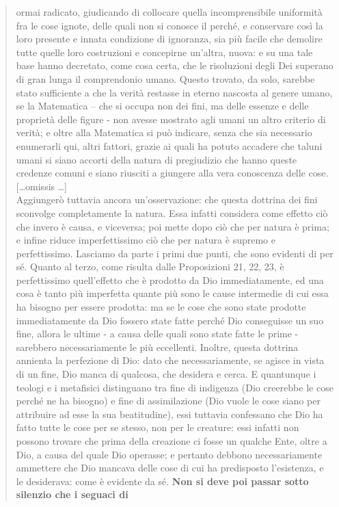 \begin{quotation}
{	ormai radicato, giudicando di collocare quella incomprensibile uniformità fra le cose
	ignote, delle quali non si conosce il perché, e conservare così la loro presente e innata condizione di ignoranza, sia più facile che demolire tutte quelle loro costruzioni e concepirne
	un’altra, nuova: e su una tale base hanno decretato, come cosa certa, che le risoluzioni degli Dei superano di gran lunga il comprendonio umano.} Questo trovato, da solo, sarebbe
	stato sufficiente a che la verità restasse in eterno nascosta al genere umano, se la Matematica – che si occupa non dei fini, ma delle essenze e delle proprietà delle figure - non avesse
	mostrato agli umani un altro criterio di verità; e oltre alla Matematica si può indicare, senza che sia necessario enumerarli qui, altri fattori, grazie ai quali ha potuto accadere che taluni umani si siano accorti della natura di pregiudizio che hanno queste credenze comuni e
	siano riusciti a giungere alla vera conoscenza delle cose.
	[\dots omissis \dots]\\
	Aggiungerò tuttavia ancora un’osservazione: che questa dottrina dei fini sconvolge
	completamente la natura. Essa infatti considera come effetto ciò che invero è causa, e viceversa; poi mette dopo ciò che per natura è prima; e infine riduce imperfettissimo ciò che
	per natura è supremo e perfettissimo. Lasciamo da parte i primi due punti, che sono evidenti di per sé. Quanto al terzo, come risulta dalle Proposizioni 21, 22, 23, è perfettissimo
	quell’effetto che è prodotto da Dio immediatamente, ed una cosa è tanto più imperfetta
	quante più sono le cause intermedie di cui essa ha bisogno per essere prodotta: ma se le cose che sono state prodotte immediatamente da Dio fossero state fatte perché Dio conseguisse un suo fine, allora le ultime - a causa delle quali sono state fatte le prime - sarebbero
	necessariamente le più eccellenti. Inoltre, questa dottrina annienta la perfezione di Dio: dato che necessariamente, se agisce in vista di un fine, Dio manca di qualcosa, che desidera e
	cerca. E quantunque i teologi e i metafisici distinguano tra fine di indigenza (Dio creerebbe
	le cose perché ne ha bisogno) e fine di assimilazione (Dio vuole le cose siano per attribuire
	ad esse la sua beatitudine), essi tuttavia confessano che Dio ha fatto tutte le cose per se
	stesso, non per le creature: essi infatti non possono trovare che prima della creazione ci
	fosse un qualche Ente, oltre a Dio, a causa del quale Dio operasse; e pertanto debbono necessariamente ammettere che Dio mancava delle cose di cui ha predisposto l’esistenza, e le
	desiderava: come è evidente da sé. \textbf{Non si deve poi passar sotto silenzio che i seguaci di
}
\end{quotation}
